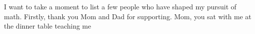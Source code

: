 \documentclass{article}
\begin{document}
I want to take a moment to list a few people who have shaped my pursuit of math.  Firstly, thank you Mom and Dad for supporting.  Mom, you sat with me at the dinner table teaching me 
\end{document}
